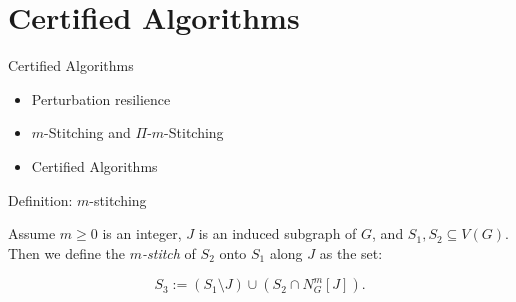 \documentclass{beamer}
\begin{document}
\section{Certified Algorithms}

\begin{frame}{Certified Algorithms}
  \begin{itemize}
    \item Perturbation resilience
    \item $m$-Stitching and $\Pi$-$m$-Stitching
    \item Certified Algorithms
  \end{itemize}
\end{frame}


\begin{frame}{Definition: $m$-stitching}
    \begin{definition}[$m$-stitching]
        \label{m-stitch}
        Assume $m \geq 0$ is an integer, $J$ is an induced subgraph of $G$, and 
        $S_1, S_2 \subseteq V(G)$. Then we define the \textit{$m$-stitch} of $S_2$ onto $S_1$ along 
        $J$ as the set:

        \[
        S_3 := (S_1 \setminus J) \cup (S_2 \cap N^{m}_{G}[J]).
        \]
    \end{definition}
\end{frame}
\end{document}
